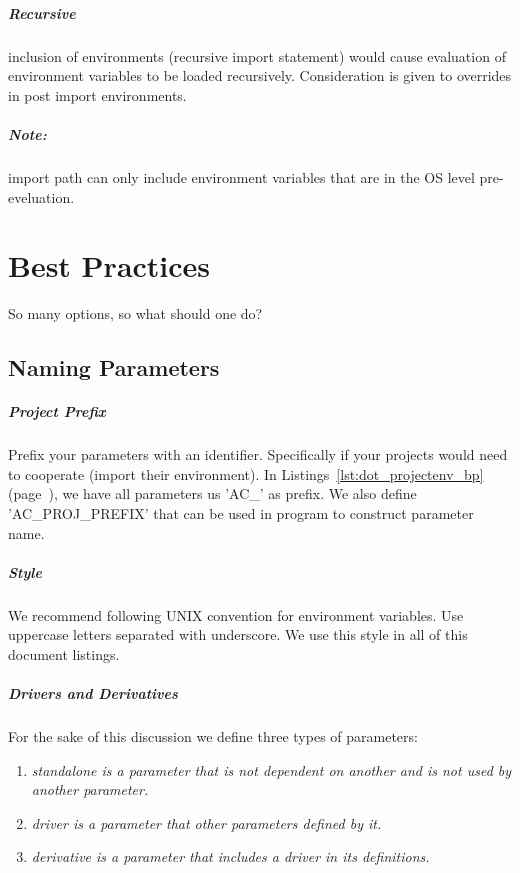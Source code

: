 \documentclass[design.tex]{subfiles}
\begin{document}
\paragraph{Recursive} inclusion of environments (recursive import statement) would cause evaluation of environment variables to be loaded recursively.  Consideration is given to overrides in post import environments.

\paragraph{Note:}import path can only include environment variables that are in the OS level pre-eveluation.

\chapter{Best Practices}
So many options, so what should one do?

\section{Naming Parameters}
\paragraph{Project Prefix}
Prefix your parameters with an identifier.  Specifically if your projects would need to cooperate (import their environment).  In Listings~\ref{lst:dot_projectenv_bp} (page~\pageref{lst:dot_projectenv_bp}), we have all parameters us 'AC\_' as prefix.  We also define 'AC\_PROJ\_PREFIX' that can be used in program to construct parameter name.

\paragraph{Style} We recommend following UNIX convention for environment variables.  Use uppercase letters separated with underscore.  We use this style in all of this document listings.

\paragraph{Drivers and Derivatives}
For the sake of this discussion we define three types of parameters:
\begin{enumerate}
	\item \em{standalone} is a parameter that is not dependent on another and is not used by another parameter.
	\item \em{driver} is a parameter that other parameters defined by it.
	\item \em{derivative} is a parameter that includes a driver in its definitions.
\end{enumerate}
\end{document}
